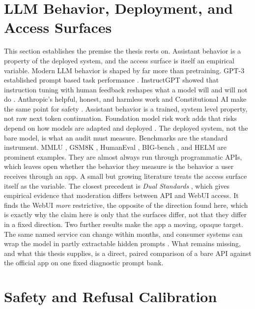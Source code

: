 \section{LLM Behavior, Deployment, and Access Surfaces}

This section establishes the premise the thesis rests on. Assistant behavior is a
property of the deployed system, and the access surface is itself an empirical
variable. Modern LLM behavior is shaped by far more than pretraining. GPT-3
established prompt based task performance \parencite{gpt3}. InstructGPT showed
that instruction tuning with human feedback reshapes what a model will and will
not do \parencite{instructgpt}. Anthropic's helpful, honest, and harmless work
and Constitutional AI make the same point for safety
\parencite{helpful_harmless,constitutional_ai}. Assistant behavior
is a trained, system level property, not raw next token continuation. Foundation
model risk work adds that risks depend on how models are adapted and deployed
\parencite{foundation_models,weidinger_risks}. The deployed system, not the bare
model, is what an audit must measure. Benchmarks are the standard
instrument. MMLU \parencite{mmlu}, GSM8K \parencite{gsm8k}, HumanEval
\parencite{codex}, BIG-bench \parencite{bigbench}, and HELM \parencite{helm} are
prominent examples. They are almost always run through programmatic APIs, which
leaves open whether the
behavior they measure is the behavior a user receives through an app. A small but
growing literature treats the access surface itself as the variable. The closest
precedent is \emph{Dual Standards} \parencite{dualstandards}, which gives
empirical evidence that moderation differs between API and WebUI access. It
finds the WebUI \emph{more} restrictive, the opposite of the direction found here,
which is exactly why the claim here is only that the surfaces differ, not that they
differ in a fixed direction. Two further results make the app a moving, opaque
target. The same named service can change within months, and consumer systems can
wrap the model in partly extractable hidden prompts
\parencite{chatgpt_drift,prompt_extraction}. What remains missing, and
what this thesis supplies, is a direct, paired comparison of a bare API against
the official app on one fixed diagnostic prompt bank.

\section{Safety and Refusal Calibration}

